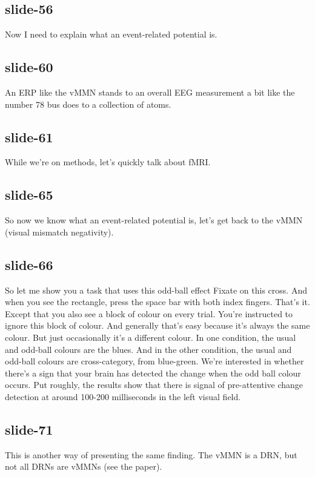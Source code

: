 \documentclass[12pt,\papersize]{extarticle}
\begin{document}
 
\subsection{slide-56}
Now I need to explain what an event-related potential is.
 
 
\subsection{slide-60}
An ERP like the vMMN stands to an overall EEG measurement a bit like the number 78 bus does to a collection of atoms.
 
 
\subsection{slide-61}
While we're on methods, let's quickly talk about fMRI.
 
 
\subsection{slide-65}
So now we know what an event-related potential is, let's get back to the vMMN (visual mismatch negativity).
 
 
\subsection{slide-66}
So let me show you a task that uses this odd-ball effect
Fixate on this cross.
And when you see the rectangle, press the space bar with both index fingers.
That's it.
Except that you also see a block of colour on every trial.
You're instructed to ignore this block of colour.
And generally that's easy because it's always the same colour.
But just occasionally it's a different colour.
In one condition, the usual and odd-ball colours are the blues.
And in the other condition, the usual and odd-ball colours are cross-category, from blue-green.
We're interested in whether there's a sign that your brain has detected the change when the odd ball colour occurs.
Put roughly, the results show that there is signal of pre-attentive change detection at around 100-200 milliseconds in the left visual field.
 
 
\subsection{slide-71}
This is another way of presenting the same finding.
The vMMN is a DRN, but not all DRNs are vMMNs (see the paper).
 
\end{document}
